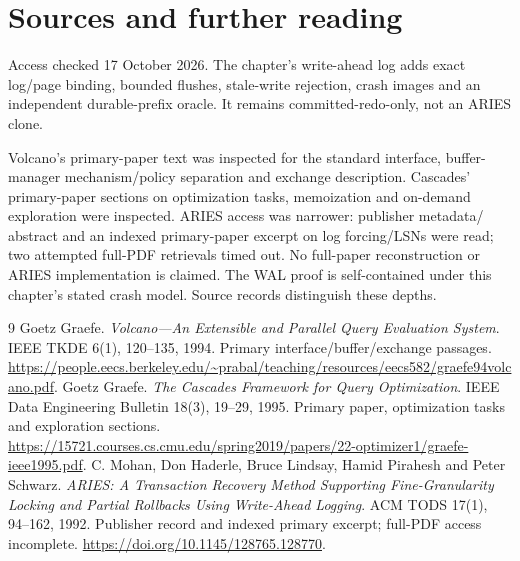 \chapter*{Sources and further reading}
Access checked 17 October 2026. The chapter's write-ahead log adds exact log/page binding, bounded flushes, stale-write rejection, crash images and an independent
durable-prefix oracle. It remains committed-redo-only, not an ARIES clone.

Volcano's primary-paper text was inspected for the standard interface,
buffer-manager mechanism/policy separation and exchange description. Cascades'
primary-paper sections on optimization tasks, memoization and on-demand
exploration were inspected. ARIES access was narrower: publisher metadata/
abstract and an indexed primary-paper excerpt on log forcing/LSNs were read;
two attempted full-PDF retrievals timed out. No full-paper reconstruction or
ARIES implementation is claimed. The WAL proof is self-contained under this
chapter's stated crash model. Source records distinguish these depths.
\begingroup
\renewcommand{\bibname}{References}
\let\chapter\section
\begin{thebibliography}{9}
 Goetz Graefe.
\emph{Volcano---An Extensible and Parallel Query Evaluation System}.
IEEE TKDE 6(1), 120--135, 1994. Primary interface/buffer/exchange passages.
\url{https://people.eecs.berkeley.edu/~prabal/teaching/resources/eecs582/graefe94volcano.pdf}.
 Goetz Graefe.
\emph{The Cascades Framework for Query Optimization}.
IEEE Data Engineering Bulletin 18(3), 19--29, 1995. Primary paper,
optimization tasks and exploration sections.
\url{https://15721.courses.cs.cmu.edu/spring2019/papers/22-optimizer1/graefe-ieee1995.pdf}.
 C. Mohan, Don Haderle, Bruce Lindsay, Hamid Pirahesh
and Peter Schwarz.
\emph{ARIES: A Transaction Recovery Method Supporting Fine-Granularity Locking
and Partial Rollbacks Using Write-Ahead Logging}. ACM TODS 17(1), 94--162, 1992.
Publisher record and indexed primary excerpt; full-PDF access incomplete.
\url{https://doi.org/10.1145/128765.128770}.
\end{thebibliography}
\endgroup
